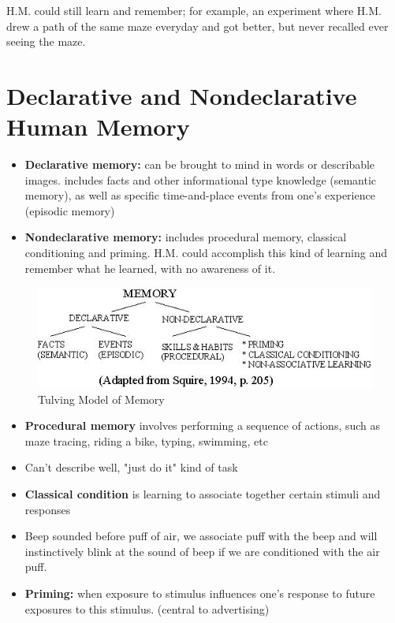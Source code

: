 \documentclass{article}
\begin{document}
H.M. could still learn and remember; for example, an experiment where H.M. drew a path of the same maze everyday and got better, but never recalled ever seeing the maze. 

\newpage
\section{Declarative and Nondeclarative Human Memory}
\begin{itemize}
    \item \textbf{Declarative memory:} can be brought to mind in words or describable images. 
        \subitem includes facts and other informational type knowledge (semantic memory), as well as specific time-and-place events from one's experience (episodic memory) 
    \item \textbf{Nondeclarative memory:} includes procedural memory, classical conditioning and priming. 
        \subitem H.M. could accomplish this kind of learning and remember what he learned, with no awareness of it. 
\end{itemize}

\begin{figure}[htp]
\centering
\includegraphics[width=\textwidth]{images/tulving_model.jpg}
\caption{Tulving Model of Memory}
\label{fig: Tulving}
\end{figure}

\begin{itemize}
    \item \textbf{Procedural memory} involves performing a sequence of actions, such as maze tracing, riding a bike, typing, swimming, etc
    \item Can't describe well, "just do it" kind of task
    \item \textbf{Classical condition} is learning to associate together certain stimuli and responses
    \item Beep sounded before puff of air, we associate puff with the beep and will instinctively blink at the sound of beep if we are conditioned with the air puff. 
    \item \textbf{Priming:} when exposure to stimulus influences one's response to future exposures to this stimulus. (central to advertising)  
\end{itemize}
\end{document}
